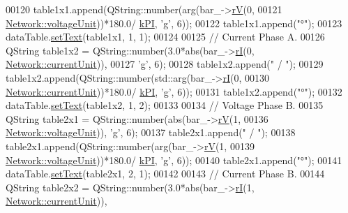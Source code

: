 \begin{DoxyCode}
00120   table1x1.append(QString::number(arg(bar\_->\hyperlink{group___models_ga6c83eb997f5038e0b9bbd5472582e0a8}{rV}(0,
00121                                       \hyperlink{group___models_gacde031ef95f5c05565ee35769f2ed89e}{Network::voltageUnit}))*180.0/
      \hyperlink{math__constants_8h_a368d99984512d9a6c6f18b37b4446431}{kPI}, \textcolor{charliteral}{'g'}, 6));
00122   table1x1.append(\textcolor{stringliteral}{"°"});
00123   dataTable.\hyperlink{class_data_table_aee0d28c77116b51360f0124a529cb3ff}{setText}(table1x1, 1, 1);
00124 
00125   \textcolor{comment}{// Current Phase A.}
00126   QString table1x2 = QString::number(3.0*abs(bar\_->\hyperlink{group___models_ga50eb46f3510205a9d6cb5e6547fa86df}{rI}(0, \hyperlink{group___models_gac6a26db5fef2b1dd2a00faf6340d1702}{Network::currentUnit})),
00127                                      \textcolor{charliteral}{'g'}, 6);
00128   table1x2.append(\textcolor{stringliteral}{" / "});
00129   table1x2.append(QString::number(std::arg(bar\_->\hyperlink{group___models_ga50eb46f3510205a9d6cb5e6547fa86df}{rI}(0,
00130                                   \hyperlink{group___models_gac6a26db5fef2b1dd2a00faf6340d1702}{Network::currentUnit}))*180.0/
      \hyperlink{math__constants_8h_a368d99984512d9a6c6f18b37b4446431}{kPI}, \textcolor{charliteral}{'g'}, 6));
00131   table1x2.append(\textcolor{stringliteral}{"°"});
00132   dataTable.\hyperlink{class_data_table_aee0d28c77116b51360f0124a529cb3ff}{setText}(table1x2, 1, 2);
00133 
00134   \textcolor{comment}{// Voltage Phase B.}
00135   QString table2x1 = QString::number(abs(bar\_->\hyperlink{group___models_ga6c83eb997f5038e0b9bbd5472582e0a8}{rV}(1,
00136                                          \hyperlink{group___models_gacde031ef95f5c05565ee35769f2ed89e}{Network::voltageUnit})), \textcolor{charliteral}{'g'}, 6);
00137   table2x1.append(\textcolor{stringliteral}{" / "});
00138   table2x1.append(QString::number(arg(bar\_->\hyperlink{group___models_ga6c83eb997f5038e0b9bbd5472582e0a8}{rV}(1,
00139                                       \hyperlink{group___models_gacde031ef95f5c05565ee35769f2ed89e}{Network::voltageUnit}))*180.0/
      \hyperlink{math__constants_8h_a368d99984512d9a6c6f18b37b4446431}{kPI}, \textcolor{charliteral}{'g'}, 6));
00140   table2x1.append(\textcolor{stringliteral}{"°"});
00141   dataTable.\hyperlink{class_data_table_aee0d28c77116b51360f0124a529cb3ff}{setText}(table2x1, 2, 1);
00142 
00143   \textcolor{comment}{// Current Phase B.}
00144   QString table2x2 = QString::number(3.0*abs(bar\_->\hyperlink{group___models_ga50eb46f3510205a9d6cb5e6547fa86df}{rI}(1, \hyperlink{group___models_gac6a26db5fef2b1dd2a00faf6340d1702}{Network::currentUnit})),

\end{DoxyCode}
